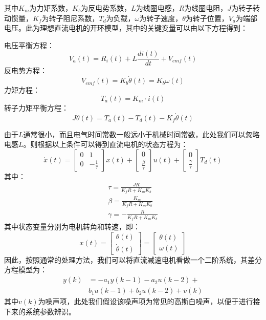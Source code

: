 \documentclass[UTF8, twocolumn]{article}
\begin{document}
其中$K_m$为力矩系数，$K_b$为反电势系数，$L$为线圈电感，$R$为线圈电阻，$J$为转子转动惯量，$K_f$为转子阻尼系数，$T_d$为负载，$\omega$为转子速度，$\theta$为转子位置，$V_a$为端部电压。此为理想直流电机的开环模型，其中的关键变量可以由以下方程得到：

\noindent 电压平衡方程：
\begin{equation*}
	V_a(t) = R_i(t) + L\frac{di(t)}{dt} + V_{emf}(t)
\end{equation*}
反电势方程：
\begin{equation*}
	V_{emf}(t) = K_b \dot{\theta}(t) = K_b \omega(t)
\end{equation*}
力矩方程：
\begin{equation*}
	T_a(t) = K_m \cdot i(t)
\end{equation*}
转子力矩平衡方程：
\begin{equation*}
	J \ddot{\theta}(t) = T_a(t) - T_d(t) - K_f\dot{\theta}(t)
\end{equation*}

由于$L$通常很小，而且电气时间常数一般远小于机械时间常数，此处我们可以忽略电感$L$。则根据以上条件可以得到直流电机的状态方程为：
\begin{equation*}
	\dot{x}(t) = 
	\begin{bmatrix}
		0 & 1 \\
		0 & -\frac{1}{\tau}
	\end{bmatrix} x(t) + 
	\begin{bmatrix}
		0 \\
		\frac{\beta}{\tau}
	\end{bmatrix} u(t) + 
	\begin{bmatrix}
		0 \\
		\frac{\gamma}{\tau}
	\end{bmatrix} T_d(t)
\end{equation*}
其中：
\begin{equation*}
	\begin{split}
		\tau = \frac{JR}{K_fR + K_mK_b} \\
		\beta = \frac{K_m}{K_fR + K_mK_b} \\
		\gamma = -\frac{R}{K_fR + K_mK_b}
	\end{split}
\end{equation*}
其中状态变量分别为电机转角和转速，即：
\begin{equation*}
	x(t) = 
	\begin{bmatrix}
		\theta(t) \\
		\dot{\theta}(t)
	\end{bmatrix} = 
	\begin{bmatrix}
		\theta(t) \\
		\omega(t)
	\end{bmatrix}
\end{equation*}
因此，按照通常的处理方法，我们可以将直流减速电机看做一个二阶系统，其差分方程模型为：
\begin{align*}
	y(k) &= -a_1y(k-1) - a_2u(k-2) + \\
	& b_1u(k-1) + b_2u(k-2) + v(k)
\end{align*}
其中$v(k)$为噪声项，此处我们假设该噪声项为常见的高斯白噪声，以便于进行接下来的系统参数辨识。
\end{document}
